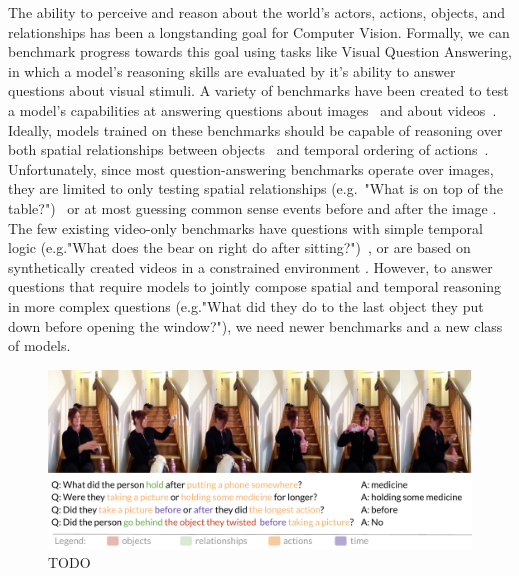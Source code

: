 The ability to perceive and reason about the world's actors, actions, objects, and relationships has been a longstanding goal for Computer Vision. Formally, we can benchmark progress towards this goal using tasks like Visual Question Answering, in which a model's reasoning skills are evaluated by it's ability to answer questions about visual stimuli. A variety of benchmarks have been created to test a model's capabilities at answering questions about images~\cite{johnson2017clevr,hudson2019gqa,antol2015vqa,zellers2019recognition,goyal2017making,krishna2017visual,zhu2016visual7w,kim2020answering} and about videos~\cite{tapaswi2016movieqa,lei2018tvqa,jang2017tgif,kim2017deepstory,xu2017video,maharaj2017dataset,zeng2016leveraging,yu2019activitynet, yi2019clevrer, mun2017marioqa}. Ideally, models trained on these benchmarks should be capable of reasoning over both spatial relationships between objects~\cite{krishna2017visual,lu2016visual} and temporal ordering of actions~\cite{zacks2001events,ji2020action}. Unfortunately, since most question-answering benchmarks operate over images, they are limited to only testing spatial relationships (e.g.~"What is on top of the table?")~\cite{hudson2019gqa,krishna2017visual,antol2015vqa} or at most guessing common sense events before and after the image \cite{park2020visualcomet}. The few existing video-only benchmarks have questions with simple temporal logic (e.g."What does the bear on right do after sitting?")~\cite{jang2017tgif,xu2017video,maharaj2017dataset,zeng2016leveraging,yu2019activitynet}, or are based on synthetically created videos in a constrained environment \cite{yi2019clevrer}. However, to answer questions that require models to jointly compose spatial and temporal reasoning in more complex questions (e.g."What did they do to the last object they put down before opening the window?"), we need newer benchmarks and a new class of models.

\begin{figure}[t]
    \centering
    \includegraphics[width=\columnwidth]{figures/pull.pdf}
    \caption{TODO}
    \label{fig:pull}
\end{figure}

